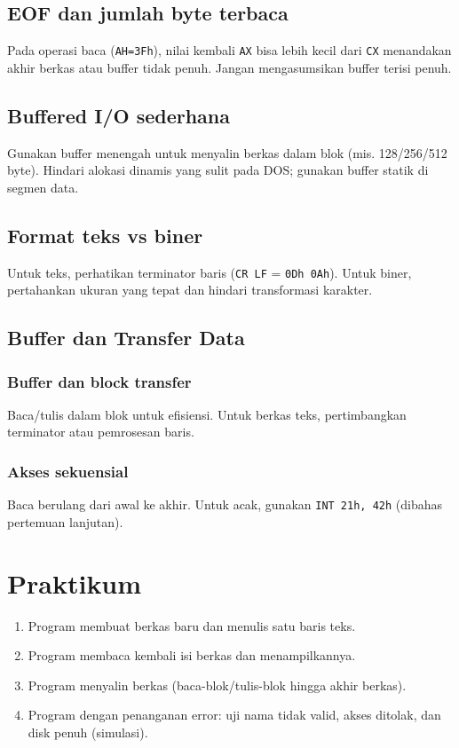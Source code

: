 \subsection{EOF dan jumlah byte terbaca}
Pada operasi baca (\texttt{AH=3Fh}), nilai kembali \texttt{AX} bisa lebih kecil dari \texttt{CX} menandakan akhir berkas atau buffer tidak penuh. Jangan mengasumsikan buffer terisi penuh. \cite{rbil}

\subsection{Buffered I/O sederhana}
Gunakan buffer menengah untuk menyalin berkas dalam blok (mis. 128/256/512 byte). Hindari alokasi dinamis yang sulit pada DOS; gunakan buffer statik di segmen data. \cite{osdev_wiki}

\subsection{Format teks vs biner}
Untuk teks, perhatikan terminator baris (\texttt{CR LF} = \texttt{0Dh 0Ah}). Untuk biner, pertahankan ukuran yang tepat dan hindari transformasi karakter. \cite{osdev_wiki}


\subsection{Buffer dan Transfer Data}
\subsubsection{Buffer dan block transfer}
Baca/tulis dalam blok untuk efisiensi. Untuk berkas teks, pertimbangkan terminator atau pemrosesan baris.

\subsubsection{Akses sekuensial}
Baca berulang dari awal ke akhir. Untuk acak, gunakan \texttt{INT 21h, 42h} (dibahas pertemuan lanjutan).

\section{Praktikum}
\begin{enumerate}
  \item Program membuat berkas baru dan menulis satu baris teks.
  \item Program membaca kembali isi berkas dan menampilkannya.
  \item Program menyalin berkas (baca-blok/tulis-blok hingga akhir berkas).
  \item Program dengan penanganan error: uji nama tidak valid, akses ditolak, dan disk penuh (simulasi).
\end{enumerate}

